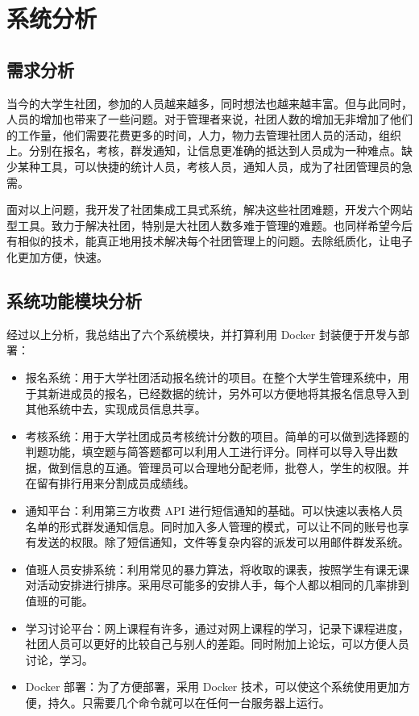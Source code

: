 \chapter{系统分析}
\label{cha:system-analysis}

\section{需求分析}
\label{sec:demand-analysis}

当今的大学生社团，参加的人员越来越多，同时想法也越来越丰富。但与此同时，人员的增加也带来了一些问题。对于管理者来说，社团人数的增加无非增加了他们的工作量，他们需要花费更多的时间，人力，物力去管理社团人员的活动，组织上。分别在报名，考核，群发通知，让信息更准确的抵达到人员成为一种难点。缺少某种工具，可以快捷的统计人员，考核人员，通知人员，成为了社团管理员的急需。

面对以上问题，我开发了社团集成工具式系统，解决这些社团难题，开发六个网站型工具。致力于解决社团，特别是大社团人数多难于管理的难题。也同样希望今后有相似的技术，能真正地用技术解决每个社团管理上的问题。去除纸质化，让电子化更加方便，快速。
  
\section{系统功能模块分析}

经过以上分析，我总结出了六个系统模块，并打算利用 Docker 封装便于开发与部署：
\begin{itemize}
  \item 报名系统：用于大学社团活动报名统计的项目。在整个大学生管理系统中，用于其新进成员的报名，已经数据的统计，另外可以方便地将其报名信息导入到其他系统中去，实现成员信息共享。
  \item 考核系统：用于大学社团成员考核统计分数的项目。简单的可以做到选择题的判题功能，填空题与简答题都可以利用人工进行评分。同样可以导入导出数据，做到信息的互通。管理员可以合理地分配老师，批卷人，学生的权限。并在留有排行用来分割成员成绩线。
  \item 通知平台：利用第三方收费 API 进行短信通知的基础。可以快速以表格人员名单的形式群发通知信息。同时加入多人管理的模式，可以让不同的账号也享有发送的权限。除了短信通知，文件等复杂内容的派发可以用邮件群发系统。
  \item 值班人员安排系统：利用常见的暴力算法，将收取的课表，按照学生有课无课对活动安排进行排序。采用尽可能多的安排人手，每个人都以相同的几率排到值班的可能。
  \item 学习讨论平台：网上课程有许多，通过对网上课程的学习，记录下课程进度，社团人员可以更好的比较自己与别人的差距。同时附加上论坛，可以方便人员讨论，学习。
  \item Docker 部署：为了方便部署，采用 Docker 技术，可以使这个系统使用更加方便，持久。只需要几个命令就可以在任何一台服务器上运行。
\end{itemize}
